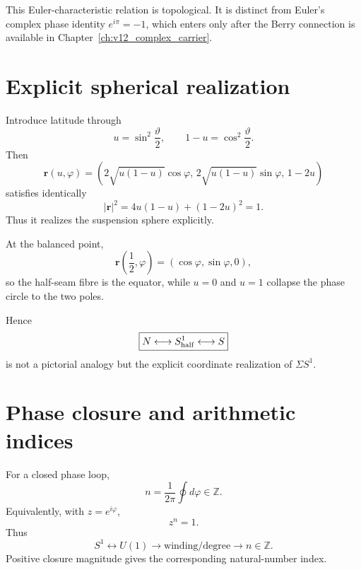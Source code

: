 This Euler-characteristic relation is topological. It is distinct from Euler's complex phase identity $e^{i\pi}=-1$, which enters only after the Berry connection is available in Chapter~\ref{ch:v12_complex_carrier}.

\section{Explicit spherical realization}

Introduce latitude through
\begin{equation}
u=\sin^2\frac{\vartheta}{2},
\qquad
1-u=\cos^2\frac{\vartheta}{2}.
\end{equation}
Then
\begin{equation}
\boxed{
\mathbf r(u,\varphi)
=
\left(
2\sqrt{u(1-u)}\cos\varphi,\,
2\sqrt{u(1-u)}\sin\varphi,\,
1-2u
\right)
}
\label{eq:v12_half_bloch_map}
\end{equation}
satisfies identically
\begin{equation}
|\mathbf r|^2
=
4u(1-u)+(1-2u)^2
=
1.
\end{equation}
Thus it realizes the suspension sphere explicitly.

At the balanced point,
\begin{equation}
\boxed{
\mathbf r\!\left(\frac12,\varphi\right)
=
(\cos\varphi,\sin\varphi,0),
}
\label{eq:v12_half_equator}
\end{equation}
so the half-seam fibre is the equator, while $u=0$ and $u=1$ collapse the phase circle to the two poles.

Hence
\begin{equation}
\boxed{
N
\longleftrightarrow
S^1_{\rm half}
\longleftrightarrow
S
}
\end{equation}
is not a pictorial analogy but the explicit coordinate realization of $\Sigma S^1$.

\section{Phase closure and arithmetic indices}

For a closed phase loop,
\begin{equation}
\boxed{
n=\frac1{2\pi}\oint d\varphi\in\mathbb Z.
}
\label{eq:v12_winding}
\end{equation}
Equivalently, with $z=e^{i\varphi}$,
\begin{equation}
z^n=1.
\end{equation}
Thus
\begin{equation}
\boxed{
S^1
\longleftrightarrow
U(1)
\longrightarrow
\text{winding/degree}
\longrightarrow
n\in\mathbb Z.
}
\end{equation}
Positive closure magnitude gives the corresponding natural-number index.


